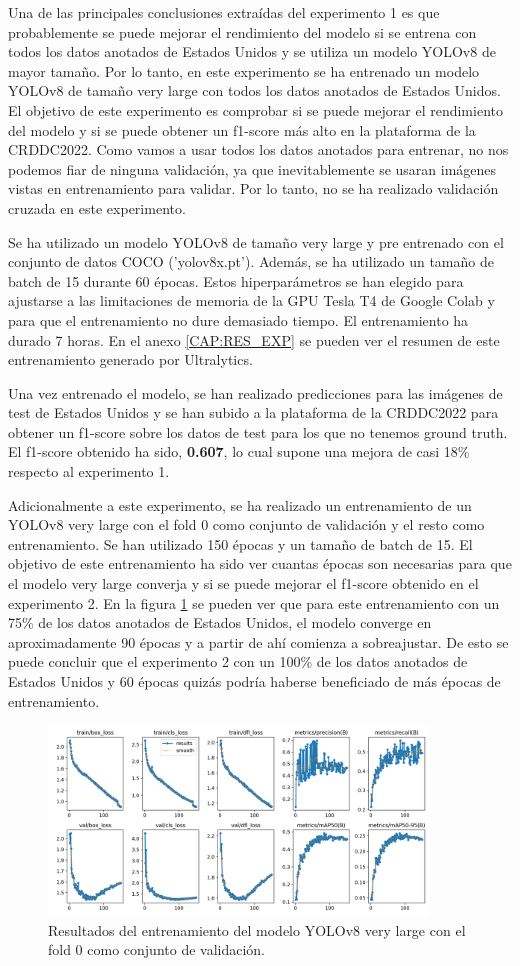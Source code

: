 Una de las principales conclusiones extraídas del experimento 1 es que probablemente se puede mejorar el rendimiento del modelo si se entrena con todos los datos anotados de Estados Unidos y se utiliza un modelo YOLOv8 de mayor tamaño. Por lo tanto, en este experimento se ha entrenado un modelo YOLOv8 de tamaño very large con todos los datos anotados de Estados Unidos. El objetivo de este experimento es comprobar si se puede mejorar el rendimiento del modelo y si se puede obtener un f1-score más alto en la plataforma de la CRDDC2022. Como vamos a usar todos los datos anotados para entrenar, no nos podemos fiar de ninguna validación, ya que inevitablemente se usaran imágenes vistas en entrenamiento para validar. Por lo tanto, no se ha realizado validación cruzada en este experimento.

Se ha utilizado un modelo YOLOv8 de tamaño very large y pre entrenado con el conjunto de datos COCO ('yolov8x.pt'). Además, se ha utilizado un tamaño de batch de 15 durante 60 épocas. Estos hiperparámetros se han elegido para ajustarse a las limitaciones de memoria de la GPU Tesla T4 de Google Colab y para que el entrenamiento no dure demasiado tiempo. El entrenamiento ha durado 7 horas. En el anexo \ref{CAP:RES_EXP} se pueden ver el resumen de este entrenamiento generado por Ultralytics.

Una vez entrenado el modelo, se han realizado predicciones para las imágenes de test de Estados Unidos y se han subido a la plataforma de la CRDDC2022 para obtener un f1-score sobre los datos de test para los que no tenemos ground truth. El f1-score obtenido ha sido, \textbf{0.607}, lo cual supone una mejora de casi 18\% respecto al experimento 1.

Adicionalmente a este experimento, se ha realizado un entrenamiento de un YOLOv8 very large con el fold 0 como conjunto de validación y el resto como entrenamiento. Se han utilizado 150 épocas y un tamaño de batch de 15. El objetivo de este entrenamiento ha sido ver cuantas épocas son necesarias para que el modelo very large converja y si se puede mejorar el f1-score obtenido en el experimento 2. En la figura \ref{fig:exp2b-results} se pueden ver que para este entrenamiento con un 75\% de los datos anotados de Estados Unidos, el modelo converge en aproximadamente 90 épocas y a partir de ahí comienza a sobreajustar. De esto se puede concluir que el experimento 2 con un 100\% de los datos anotados de Estados Unidos y 60 épocas quizás podría haberse beneficiado de más épocas de entrenamiento.

\begin{figure}[H]
    \centering
    \includegraphics[width=0.9\textwidth]{img/exp2b-results.png}
    \caption{Resultados del entrenamiento del modelo YOLOv8 very large con el fold 0 como conjunto de validación.}
    \label{fig:exp2b-results}
\end{figure}